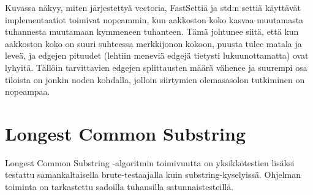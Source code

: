 \documentclass{article}
\begin{document}
            Kuvassa näkyy, miten järjestettyä vectoria, FastSettiä ja std:n settiä käyttävät implementaatiot toimivat nopeammin,
            kun aakkoston koko kasvaa muutamasta tuhannesta muutamaan kymmeneen tuhanteen. Tämä johtunee siitä, että kun aakkoston
            koko on suuri suhteessa merkkijonon kokoon, puusta tulee matala ja leveä, ja edgejen pituudet (lehtiin meneviä edgejä
            tietysti lukuunottamatta) ovat lyhyitä. Tällöin tarvittavien edgejen splittausten määrä vähenee ja suurempi osa tiloista
            on jonkin noden kohdalla, jolloin siirtymien olemasasolon tutkiminen on nopeampaa.
            

    \section{Longest Common Substring}
        Longest Common Substring -algoritmin toimivuutta on yksikkötestien lisäksi testattu samankaltaisella brute-testaajalla kuin
        substring-kyselyissä. Ohjelman toiminta on tarkastettu sadoilla tuhansilla satunnaistesteillä.
\end{document}
